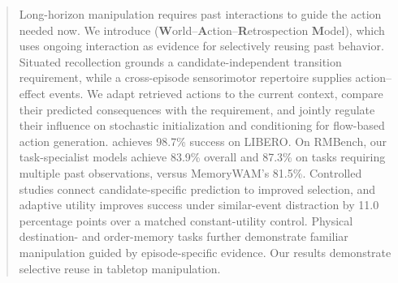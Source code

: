 \begin{abstract}
Long-horizon manipulation requires past interactions to guide the action needed now.
We introduce \method{} (\textbf{W}orld--\textbf{A}ction--\textbf{R}etrospection \textbf{M}odel), which uses ongoing interaction as evidence for selectively reusing past behavior.
Situated recollection grounds a candidate-independent transition requirement, while a cross-episode sensorimotor repertoire supplies action--effect events.
We adapt retrieved actions to the current context, compare their predicted consequences with the requirement, and jointly regulate their influence on stochastic initialization and conditioning for flow-based action generation.
\method{} achieves 98.7\% success on LIBERO. On RMBench, our task-specialist models achieve 83.9\% overall and 87.3\% on tasks requiring multiple past observations, versus MemoryWAM's 81.5\%.
Controlled studies connect candidate-specific prediction to improved selection, and adaptive utility improves success under similar-event distraction by 11.0 percentage points over a matched constant-utility control.
Physical destination- and order-memory tasks further demonstrate familiar manipulation guided by episode-specific evidence.
Our results demonstrate selective reuse in tabletop manipulation.
\end{abstract}
